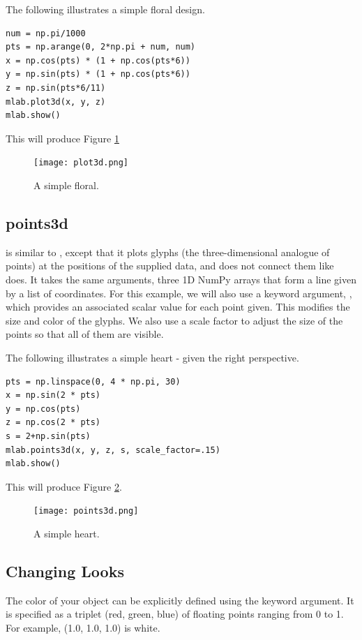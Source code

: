 The following illustrates a simple floral design.
\begin{lstlisting}
num = np.pi/1000
pts = np.arange(0, 2*np.pi + num, num)
x = np.cos(pts) * (1 + np.cos(pts*6))
y = np.sin(pts) * (1 + np.cos(pts*6))
z = np.sin(pts*6/11)
mlab.plot3d(x, y, z)
mlab.show()
\end{lstlisting}
This will produce Figure \ref{fig:plot3d}
\begin{figure}
\texttt{[image: plot3d.png]}
\caption{A simple floral.}
\label{fig:plot3d}
\end{figure}


\subsection*{points3d}
 is similar to , except that it plots glyphs (the three-dimensional analogue of points) at the positions of the supplied data, and does not connect them like  does.
It takes the same arguments, three 1D NumPy arrays that form a line given by a list of  coordinates.
For this example, we will also use a keyword argument, , which provides an associated scalar value for each point given.
This modifies the size and color of the glyphs.
We also use a scale factor to adjust the size of the points so that all of them are visible.

The following illustrates a simple heart - given the right perspective.
\begin{lstlisting}
pts = np.linspace(0, 4 * np.pi, 30)
x = np.sin(2 * pts)
y = np.cos(pts)
z = np.cos(2 * pts)
s = 2+np.sin(pts)
mlab.points3d(x, y, z, s, scale_factor=.15)
mlab.show()
\end{lstlisting}
This will produce Figure \ref{fig:points3d}.

\begin{figure}
\texttt{[image: points3d.png]}
\caption{A simple heart.}
\label{fig:points3d}
\end{figure}

\subsection*{Changing Looks}
The color of your object can be explicitly defined using the  keyword argument.
It is specified as a triplet (red, green, blue) of floating points ranging from 0 to 1.
For example, (1.0, 1.0, 1.0) is white.

